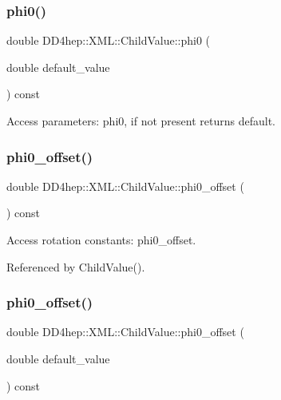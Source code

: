 \subsubsection{\texorpdfstring{phi0()}{phi0()}\hspace{0.1cm}{\footnotesize\ttfamily [2/2]}}
{\footnotesize\ttfamily double D\+D4hep\+::\+X\+M\+L\+::\+Child\+Value\+::phi0 (\begin{DoxyParamCaption}\item[{double}]{default\+\_\+value }\end{DoxyParamCaption}) const}



Access parameters\+: phi0, if not present returns default. 

\hypertarget{struct_d_d4hep_1_1_x_m_l_1_1_child_value_aa160dd03560f4b8ec202fda672003e74}{}\label{struct_d_d4hep_1_1_x_m_l_1_1_child_value_aa160dd03560f4b8ec202fda672003e74} 
\subsubsection{\texorpdfstring{phi0\+\_\+offset()}{phi0\_offset()}\hspace{0.1cm}{\footnotesize\ttfamily [1/2]}}
{\footnotesize\ttfamily double D\+D4hep\+::\+X\+M\+L\+::\+Child\+Value\+::phi0\+\_\+offset (\begin{DoxyParamCaption}{ }\end{DoxyParamCaption}) const}



Access rotation constants\+: phi0\+\_\+offset. 



Referenced by Child\+Value().

\hypertarget{struct_d_d4hep_1_1_x_m_l_1_1_child_value_a9ab4ff962b057440fd49f6207586b3ae}{}\label{struct_d_d4hep_1_1_x_m_l_1_1_child_value_a9ab4ff962b057440fd49f6207586b3ae} 
\subsubsection{\texorpdfstring{phi0\+\_\+offset()}{phi0\_offset()}\hspace{0.1cm}{\footnotesize\ttfamily [2/2]}}
{\footnotesize\ttfamily double D\+D4hep\+::\+X\+M\+L\+::\+Child\+Value\+::phi0\+\_\+offset (\begin{DoxyParamCaption}\item[{double}]{default\+\_\+value }\end{DoxyParamCaption}) const}



